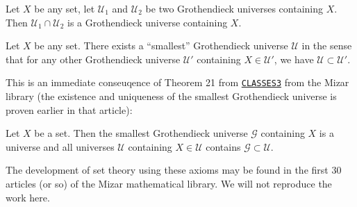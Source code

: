 \begin{lemma}\label{set:tg-000D}%
Let $X$ be any set, let $\mathcal{U}_{1}$ and $\mathcal{U}_{2}$ be two
Grothendieck universes containing $X$. Then
$\mathcal{U}_{1}\cap\mathcal{U}_{2}$ is a Grothendieck universe
containing $X$.
\end{lemma}

\begin{theorem}\label{set:tg-000C}%
Let $X$ be any set. There exists a ``smallest'' Grothendieck universe
$\mathcal{U}$ in the sense that for any other Grothendieck universe
$\mathcal{U}'$ containing $X\in\mathcal{U}'$, we have
$\mathcal{U}\subset\mathcal{U}'$.
\end{theorem}

This is an immediate conseuqence of Theorem 21 from \href{https://mizar.uwb.edu.pl/version/current/html/classes3.html\#T21}{\texttt{CLASSES3}}
from the Mizar library (the existence and uniqueness of the smallest
Grothendieck universe is proven earlier in that article):

\begin{theorem}
Let $X$ be a set. Then the smallest Grothendieck universe
$\mathcal{G}$ containing $X$ is a universe and all universes
$\mathcal{U}$ containing $X\in\mathcal{U}$ contains
$\mathcal{G}\subset\mathcal{U}$.
\end{theorem}

\begin{node}\label{tg-000A}%
The development of set theory using these axioms may be found in the
first 30 articles (or so) of the Mizar mathematical library. We will not
reproduce the work here.
\end{node}

